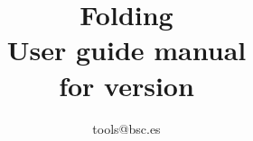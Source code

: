 \documentclass[twoside,a4paper,english,11pt]{book}
\newcommand{\FOLDING}{\textsf{{F}olding}}
\begin{document}

\title{\FOLDING \\
       User guide manual\\
       for version \FOLDINGVERSION}
\author{
tools@bsc.es
}

\maketitle
\tableofcontents
\listoffigures
\listoftables






\end{document}
